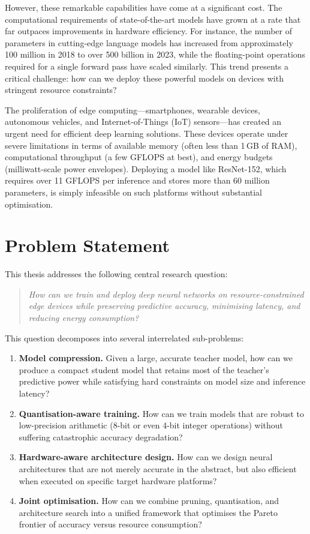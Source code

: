 \documentclass[12pt,a4paper,oneside]{book}
\begin{document}
However, these remarkable capabilities have come at a significant
cost. The computational requirements of state-of-the-art models have
grown at a rate that far outpaces improvements in hardware
efficiency. For instance, the number of parameters in cutting-edge
language models has increased from approximately 100 million in 2018 to
over 500 billion in 2023, while the floating-point operations required
for a single forward pass have scaled similarly. This trend presents a
critical challenge: how can we deploy these powerful models on devices
with stringent resource constraints?

The proliferation of edge computing---smartphones, wearable devices,
autonomous vehicles, and Internet-of-Things (IoT) sensors---has created
an urgent need for efficient deep learning solutions. These devices
operate under severe limitations in terms of available memory (often
less than 1\,GB of RAM), computational throughput (a few GFLOPS at
best), and energy budgets (milliwatt-scale power envelopes). Deploying
a model like ResNet-152, which requires over 11 GFLOPS per inference and
stores more than 60 million parameters, is simply infeasible on such
platforms without substantial optimisation.

\section{Problem Statement}

This thesis addresses the following central research question:

\begin{quote}
\itshape How can we train and deploy deep neural networks on
resource-constrained edge devices while preserving predictive accuracy,
minimising latency, and reducing energy consumption?
\end{quote}

This question decomposes into several interrelated sub-problems:

\begin{enumerate}[label=(\arabic*)]
  \item \textbf{Model compression.} Given a large, accurate teacher
  model, how can we produce a compact student model that retains most of
  the teacher's predictive power while satisfying hard constraints on
  model size and inference latency?

  \item \textbf{Quantisation-aware training.} How can we train models
  that are robust to low-precision arithmetic (8-bit or even 4-bit
  integer operations) without suffering catastrophic accuracy
  degradation?

  \item \textbf{Hardware-aware architecture design.} How can we design
  neural architectures that are not merely accurate in the abstract, but
  also efficient when executed on specific target hardware platforms?

  \item \textbf{Joint optimisation.} How can we combine pruning,
  quantisation, and architecture search into a unified framework that
  optimises the Pareto frontier of accuracy versus resource consumption?
\end{enumerate}
\end{document}
